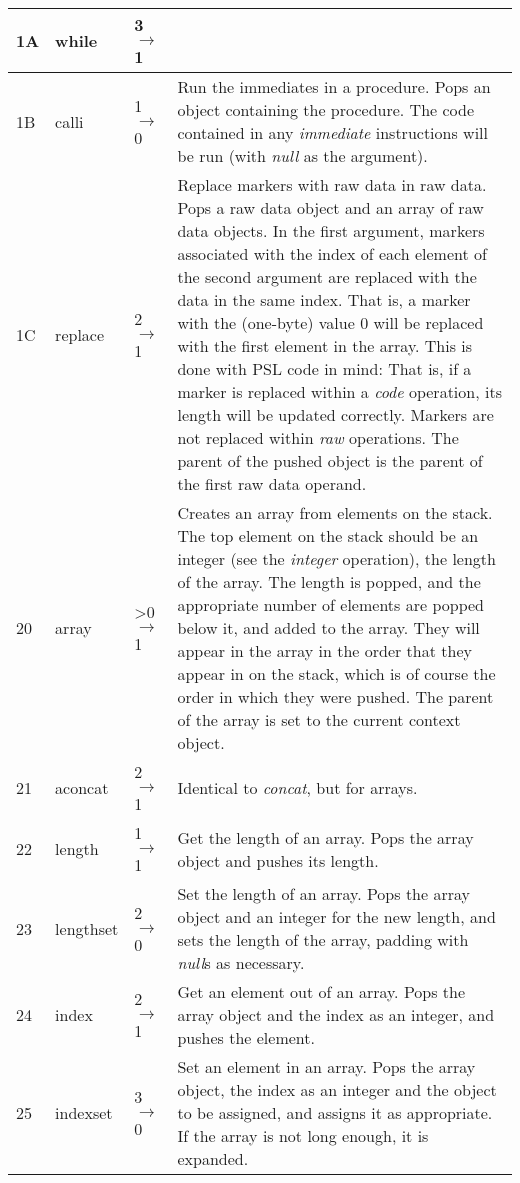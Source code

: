 \begin{longtable}{ | l | l | l | X | }
\hline
1A & while & 3 $\rightarrow$ 1 &  \\
\hline
1B & calli & 1 $\rightarrow$ 0 & Run the immediates in a procedure. Pops an object containing the procedure. The code contained in any \textit{immediate} instructions will be run (with \textit{null} as the argument). \\
\hline
1C & replace & 2 $\rightarrow$ 1 & Replace markers with raw data in raw data. Pops a raw data object and an array of raw data objects. In the first argument, markers associated with the index of each element of the second argument are replaced with the data in the same index. That is, a marker with the (one-byte) value 0 will be replaced with the first element in the array. This is done with PSL code in mind: That is, if a marker is replaced within a \textit{code} operation, its length will be updated correctly. Markers are not replaced within \textit{raw} operations. The parent of the pushed object is the parent of the first raw data operand. \\
\hline
20 & array & >0 $\rightarrow$ 1 & Creates an array from elements on the stack. The top element on the stack should be an integer (see the \textit{integer} operation), the length of the array. The length is popped, and the appropriate number of elements are popped below it, and added to the array. They will appear in the array in the order that they appear in on the stack, which is of course the order in which they were pushed. The parent of the array is set to the current context object. \\
\hline
21 & aconcat & 2 $\rightarrow$ 1 & Identical to \textit{concat}, but for arrays. \\
\hline
22 & length & 1 $\rightarrow$ 1 & Get the length of an array. Pops the array object and pushes its length. \\
\hline
23 & lengthset & 2 $\rightarrow$ 0 & Set the length of an array. Pops the array object and an integer for the new length, and sets the length of the array, padding with \textit{null}s as necessary. \\
\hline
24 & index & 2 $\rightarrow$ 1 & Get an element out of an array. Pops the array object and the index as an integer, and pushes the element. \\
\hline
25 & indexset & 3 $\rightarrow$ 0 & Set an element in an array. Pops the array object, the index as an integer and the object to be assigned, and assigns it as appropriate. If the array is not long enough, it is expanded. \\

\end{longtable}
